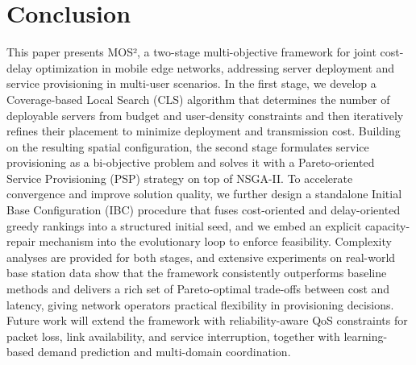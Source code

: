 \documentclass[10pt, conference, letterpaper]{IEEEtran}
\begin{document}
\section{Conclusion}
 This paper presents MOS², a two-stage multi-objective framework for joint cost-delay optimization in mobile edge networks,
   addressing server deployment and service provisioning in multi-user scenarios. In the first stage, we develop a
  Coverage-based Local Search (CLS) algorithm that determines the number of deployable servers from budget and user-density
  constraints and then iteratively refines their placement to minimize deployment and transmission cost. Building on the
  resulting spatial configuration, the second stage formulates service provisioning as a bi-objective problem and solves it
  with a Pareto-oriented Service Provisioning (PSP) strategy on top of NSGA-II. To accelerate convergence and improve
  solution quality, we further design a standalone Initial Base Configuration (IBC) procedure that fuses cost-oriented and
  delay-oriented greedy rankings into a structured initial seed, and we embed an explicit capacity-repair mechanism into the
   evolutionary loop to enforce feasibility. Complexity analyses are provided for both stages, and extensive experiments on
  real-world base station data show that the framework consistently outperforms baseline methods and delivers a rich set of
  Pareto-optimal trade-offs between cost and latency, giving network operators practical flexibility in provisioning
  decisions. Future work will extend the framework with reliability-aware QoS constraints for packet loss, link availability, and service interruption, together with learning-based demand prediction and multi-domain coordination.

\end{document}
